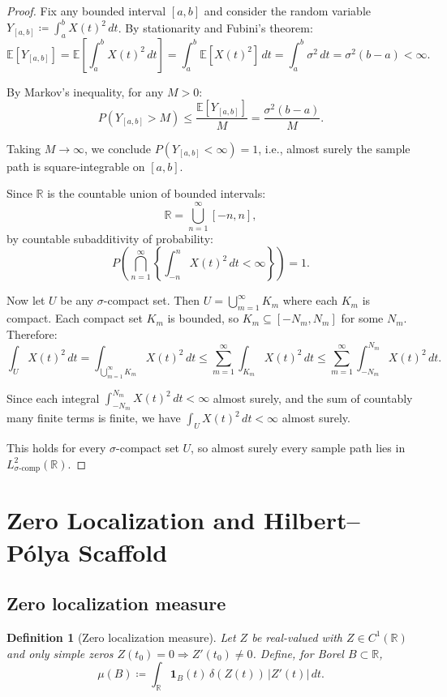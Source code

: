 \documentclass{article}
\newtheorem{definition}[theorem]{Definition}
\begin{document}
\begin{proof}
Fix any bounded interval $[a,b]$ and consider the random variable $Y_{[a,b]}\coloneqq \int_a^b X(t)^2\,dt$. By stationarity and Fubini's theorem:
\[
\mathbb{E}[Y_{[a,b]}] = \mathbb{E}\left[\int_a^b X(t)^2\,dt\right] = \int_a^b \mathbb{E}[X(t)^2]\,dt = \int_a^b \sigma^2\,dt = \sigma^2(b-a)<\infty.
\]

By Markov's inequality, for any $M>0$:
\[
P(Y_{[a,b]}>M) \leq \frac{\mathbb{E}[Y_{[a,b]}]}{M} = \frac{\sigma^2(b-a)}{M}.
\]

Taking $M\to\infty$, we conclude $P(Y_{[a,b]}<\infty)=1$, i.e., almost surely the sample path is square-integrable on $[a,b]$.

Since $\mathbb{R}$ is the countable union of bounded intervals:
\[
\mathbb{R} = \bigcup_{n=1}^\infty [-n,n],
\]
by countable subadditivity of probability:
\[
P\left(\bigcap_{n=1}^\infty \left\{\int_{-n}^n X(t)^2\,dt<\infty\right\}\right) = 1.
\]

Now let $U$ be any $\sigma$-compact set. Then $U=\bigcup_{m=1}^\infty K_m$ where each $K_m$ is compact. Each compact set $K_m$ is bounded, so $K_m\subseteq [-N_m,N_m]$ for some $N_m$. Therefore:
\[
\int_U X(t)^2\,dt = \int_{\bigcup_{m=1}^\infty K_m} X(t)^2\,dt \leq \sum_{m=1}^\infty \int_{K_m} X(t)^2\,dt \leq \sum_{m=1}^\infty \int_{-N_m}^{N_m} X(t)^2\,dt.
\]

Since each integral $\int_{-N_m}^{N_m} X(t)^2\,dt<\infty$ almost surely, and the sum of countably many finite terms is finite, we have $\int_U X(t)^2\,dt<\infty$ almost surely.

This holds for every $\sigma$-compact set $U$, so almost surely every sample path lies in $L^2_{\sigma\text{-comp}}(\mathbb{R})$.
\end{proof}

\section{Zero Localization and Hilbert--P\'olya Scaffold}\label{sec:HP}

\subsection{Zero localization measure}
\begin{definition}[Zero localization measure]\label{def:zeromeasure}
Let $Z$ be real-valued with $Z\in C^1(\mathbb{R})$ and only simple zeros $Z(t_0)=0\Rightarrow Z'(t_0)\neq 0$. Define, for Borel $B\subset\mathbb{R}$,
\[
\mu(B)\coloneqq \int_{\mathbb{R}} \mathbf{1}_B(t)\,\delta(Z(t))\,|Z'(t)|\,dt.
\]
\end{definition}
\end{document}
